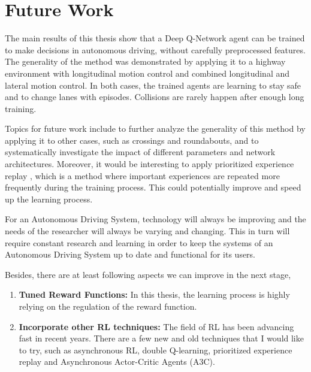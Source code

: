 \chapter{Future Work}

The main results of this thesis show that a Deep Q-Network agent can be trained to make decisions in autonomous driving, without carefully preprocessed features. The generality of the method was demonstrated by applying it to a highway environment with longitudinal motion control and combined longitudinal and lateral motion control. In both cases, the trained agents are learning to stay safe and to change lanes with episodes. Collisions are rarely happen after enough long training. 

Topics for future work include to further analyze the generality of this method by applying it to other cases, such as crossings and roundabouts, and to systematically investigate the impact of different parameters and network architectures. Moreover, it would be interesting to apply prioritized experience replay \cite{Replay2015}, which is a method where important experiences are repeated more frequently during the training process. This could potentially improve and speed up the learning process.

For an Autonomous Driving System, technology will always be improving and the needs of the researcher will always be varying and changing. This in turn will require constant research and learning in order to keep the systems of an Autonomous Driving System up to date and functional for its users.

Besides, there are at least following aspects we can improve in the next stage,

\begin{enumerate}

    \item \textbf{Tuned Reward Functions:} In this thesis, the learning process is highly relying on the regulation of the reward function.

    \item \textbf{Incorporate other RL techniques:} The field of RL has been advancing fast in recent years. There are a few new and old techniques that I would like to try, such as asynchronous RL, double Q-learning, prioritized experience replay and Asynchronous Actor-Critic Agents (A3C).

\end{enumerate}
